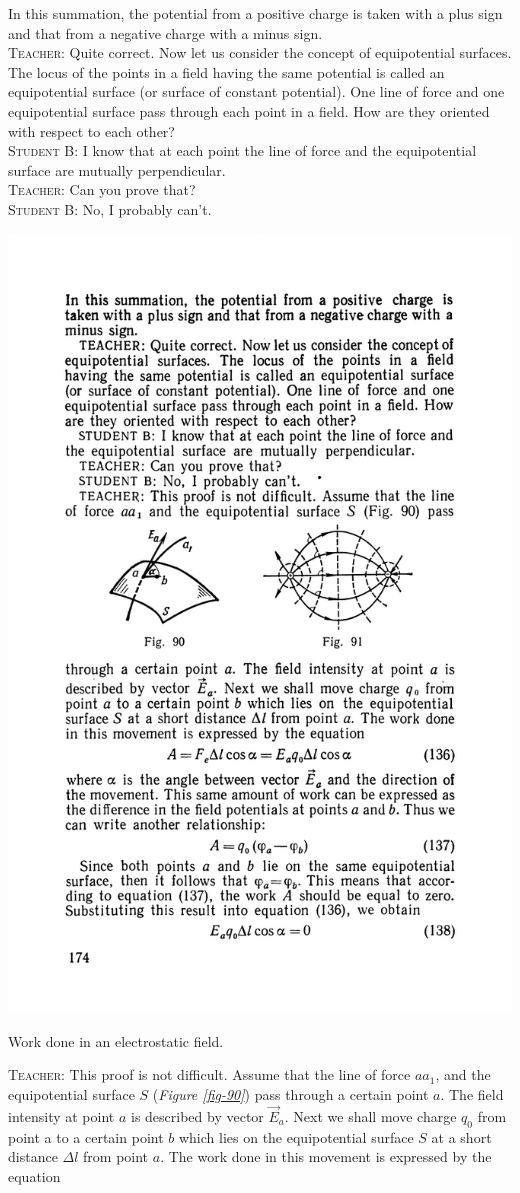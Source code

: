 \documentclass[a4paper,sfsidenotes]{tufte-book}
\begin{document}
In this summation, the potential from a positive charge is taken with a plus sign and that from a negative charge with a minus sign.
\\
\textsc{Teacher:} Quite correct. Now let us consider the concept of equipotential surfaces. The locus of the points in a field having the same potential is called an equipotential surface (or surface of constant potential). One line of force and one equipotential surface pass through each point in a field. How are they oriented with respect to each other?
\\
\textsc{Student B:} I know that at each point the line of force and the equipotential surface are mutually perpendicular.
\\
\textsc{Teacher:} Can you prove that?
\\
\textsc{Student B:} No, I probably can't.
\\
\begin{marginfigure}%
\centering
\includegraphics[width=.7\linewidth]{fig-090a}
\caption{Work done in an electrostatic field.}
\label{fig-90}
\end{marginfigure}
\textsc{Teacher:} This proof is not difficult. Assume that the line of force $aa_{1}$, and the equipotential surface $S$ (\emph{Figure \ref{fig-90}}) pass through a certain point $a$. The field intensity at point $a$ is described by vector $\vec{E}_{a}$. Next we shall move charge $q_{0}$ from point a to a certain point $b$ which lies on the equipotential surface $S$ at a short distance $\Delta l$ from point $a$. The work done in this movement is expressed by the equation
\end{document}
